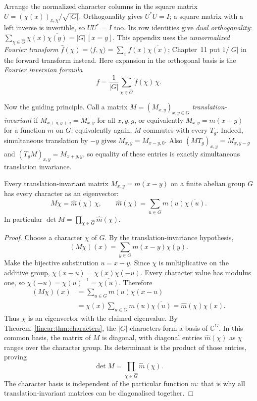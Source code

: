 Arrange the normalized character columns in the square matrix
$U=(\chi(x))_{x,\chi}/\sqrt{|G|}$. Orthogonality gives $U^*U=I$; a square
matrix with a left inverse is invertible, so $UU^*=I$ too. Its row identities
give \emph{dual orthogonality}:
$\sum_{\chi\in\widehat G}\chi(x)\overline{\chi(y)}=|G|\,[x=y]$.
This appendix uses the \emph{unnormalized Fourier transform}
$\hat f(\chi)=\langle f,\chi\rangle=\sum_xf(x)\overline{\chi(x)}$;
Chapter~11 put $1/|G|$ in the forward transform instead. Here expansion in the
orthogonal basis is the \emph{Fourier inversion formula}
\[
f=\frac1{|G|}\sum_{\chi\in\widehat G}\hat f(\chi)\,\chi.
\]

Now the guiding principle. Call a matrix $M=(M_{x,y})_{x,y\in G}$ \emph{translation-invariant} if $M_{x+g,y+g}=M_{x,y}$ for all
$x,y,g$, or equivalently $M_{x,y}=m(x-y)$ for a function $m$ on $G$; equivalently again, $M$ commutes with every $T_g$.
Indeed, simultaneous translation by $-y$ gives $M_{x,y}=M_{x-y,0}$.
Also $(MT_g)_{x,y}=M_{x,y-g}$ and $(T_gM)_{x,y}=M_{x+g,y}$, so equality
of these entries is exactly simultaneous translation invariance.

\begin{theorem}\label{linear:thm:invariant}
Every translation-invariant matrix $M_{x,y}=m(x-y)$ on a finite abelian group $G$ has every character as an eigenvector:
\[
M\chi=\hat m(\chi)\,\chi,\qquad\hat m(\chi)=\sum_{u\in G}m(u)\overline{\chi(u)}.
\]
In particular $\det M=\prod_{\chi\in\widehat G}\hat m(\chi)$.
\end{theorem}
\begin{proof}
Choose a character $\chi$ of $G$.
By the translation-invariance hypothesis,
\[
(M\chi)(x)=\sum_{y\in G}m(x-y)\chi(y).
\]
Make the bijective substitution $u=x-y$.
Since $\chi$ is multiplicative on the
additive group,
$\chi(x-u)=\chi(x)\chi(-u)$.
Every character value has modulus one,
so $\chi(-u)=\chi(u)^{-1}
=\overline{\chi(u)}$. Therefore
\[
\begin{aligned}
(M\chi)(x)
 &=\sum_{u\in G}m(u)\chi(x-u)\\
 &=\chi(x)\sum_{u\in G}m(u)
          \overline{\chi(u)}
 =\widehat m(\chi)\chi(x).
\end{aligned}
\]
Thus $\chi$ is an eigenvector with
the claimed eigenvalue. By
Theorem~\ref{linear:thm:characters}, the
$|G|$ characters form a basis of
$\mathbb C^G$. In this common basis,
the matrix of $M$ is diagonal,
with diagonal entries
$\widehat m(\chi)$ as $\chi$
ranges over the character group.
Its determinant is the product of
those entries, proving
\[
\det M=\prod_{\chi\in\widehat G}
\widehat m(\chi).
\]
The character basis is independent
of the particular function $m$:
that is why all translation-invariant
matrices can be diagonalised together.
\end{proof}


